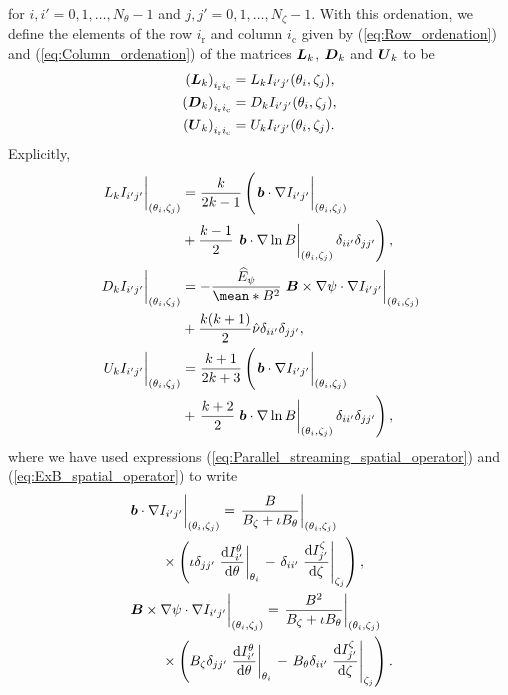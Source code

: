 for $i,i'=0,1,\ldots,N_\theta-1$ and  $j,j'=0,1,\ldots,N_\zeta-1$. With this ordenation, we define the elements of the row $i_{\text{r}}$ and column $i_{\text{c}}$ given by (\ref{eq:Row_ordenation}) and (\ref{eq:Column_ordenation}) of the matrices $\vb*{L}_k$, $\vb*{D}_k$ and $\vb*{U}_k$ to be 
%
\begin{align}
	\left(\vb*{L}_k\right)_{i_{\text{r}} i_{\text{c}}}
	& =
	{L_k I_{i'j'}}{(\theta_i,\zeta_j)},
	\\
	\left(\vb*{D}_k\right)_{i_{\text{r}} i_{\text{c}}}
	& =
	{D_k I_{i'j'}}{(\theta_i,\zeta_j)},
	\\
	\left(\vb*{U}_k\right)_{i_{\text{r}} i_{\text{c}}}
	& =
	{U_k I_{i'j'}}{(\theta_i,\zeta_j)}.
\end{align}
Explicitly,
\begin{align}
	\eval{L_k I_{i'j'}}_{(\theta_i,\zeta_j)}
	& =
	\frac{k}{2k-1} 
	\left(
	\eval{\vb*{b} \cdot \nabla I_{i'j'}}_{(\theta_i,\zeta_j)}
	 \nonumber
	 \right.
	 \\
	 &
	 +
	\frac{k-1}{2}
	\left.
	\eval{\vb*{b}\cdot\nabla \ln B}_{(\theta_i,\zeta_j)}	
	\delta_{ii'}\delta_{jj'}
	\right)
    ,
	\\
	\eval{D_k I_{i'j'}}_{(\theta_i,\zeta_j)}
	& =
	-\frac{\widehat{E}_\psi}{\mean*{B^2}}
	\eval{\vb*{B}\times \nabla\psi  \cdot \nabla 
	I_{i'j'}}_{(\theta_i,\zeta_j)}
	\nonumber \\
	& +  
	\frac{k(k+1)}{2}
	\hat{\nu}\delta_{ii'}\delta_{jj'}
	,
	\\
	\eval{U_k I_{i'j'}}_{(\theta_i,\zeta_j)}
	& = 
	\frac{k+1}{2k+3} 
	\left(
	\eval{\vb*{b} \cdot \nabla  I_{i'j'}}_{(\theta_i,\zeta_j) } 
	\right. \nonumber
	\\
	& +
	\left.
	\frac{k+2}{2}
	\eval{\vb*{b}\cdot\nabla \ln B}_{(\theta_i,\zeta_j)}	
	\delta_{ii'}\delta_{jj'}
	\right)
	,
\end{align}
where we have used expressions (\ref{eq:Parallel_streaming_spatial_operator}) and (\ref{eq:ExB_spatial_operator}) to write
%
\begin{align}
    & \eval{\vb*{b} \cdot \nabla  I_{i'j'}}_{(\theta_i,\zeta_j) }
	=
	\eval{\frac{B}{B_\zeta + \iota B_\theta}}_{(\theta_i,\zeta_j)}
	\nonumber\\
	& \qquad \times
	\left(
	\iota 
	\delta_{jj'}
	\eval{\dv{I_{i'}^{\theta}}{\theta}}_{\theta_i}
	\right.
	 -
	\left.
	\delta_{ii'}
	\eval{\dv{I_{j'}^{\zeta}}{\zeta}}_{\zeta_j}
	\right),
	\\
	& \eval{\vb*{B}\times \nabla\psi  \cdot \nabla 
	I_{i'j'}}_{(\theta_i,\zeta_j)}
    =
    \eval{\frac{B^2}{B_\zeta + \iota B_\theta}}_{(\theta_i,\zeta_j)}
    \nonumber \\ 
    &
    \qquad
    \times\left(
    B_\zeta 
    \delta_{jj'}
    \eval{\dv{I_{i'}^{\theta}}{\theta}}_{\theta_i}
    \right. 
    -
    \left.
    B_\theta 
    \delta_{ii'}
    \eval{\dv{I_{j'}^{\zeta}}{\zeta}}_{\zeta_j}
    \right).
\end{align}
